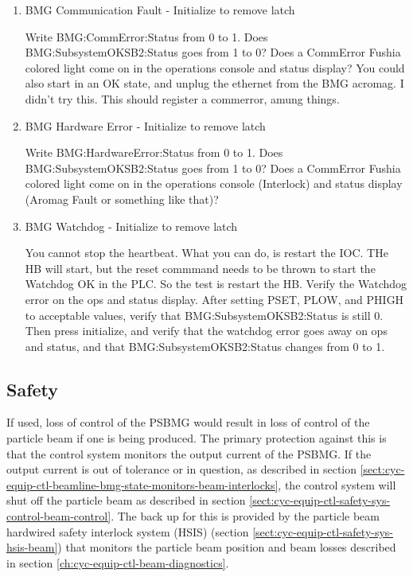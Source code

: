 \documentclass[11pt]{book}		%
\begin{document}
\begin{enumerate}
 \item BMG Communication Fault - Initialize to remove latch

\color{red}
Write BMG:CommError:Status from 0 to 1. Does BMG:SubsystemOKSB2:Status goes from 1 to 0? Does a CommError Fushia colored light come on in the operations console and status display? You could also start in an OK state, and unplug the ethernet from the BMG acromag. I didn't try this. This should register a commerror, amung things.
\color{black}

 \item BMG Hardware Error - Initialize to remove latch

\color{red}
Write BMG:HardwareError:Status from 0 to 1. Does BMG:SubsystemOKSB2:Status goes from 1 to 0? Does a CommError Fushia colored light come on in the operations console (Interlock) and status display (Aromag Fault or something like that)?
\color{black}


 \item BMG Watchdog - Initialize to remove latch

\color{red}
You cannot stop the heartbeat. What you can do, is restart the IOC. THe HB will start, but the reset commmand needs to be thrown to start the Watchdog OK in the PLC. So the test is restart the HB. Verify the Watchdog error on the ops and status display. After setting PSET, PLOW, and PHIGH to acceptable values, verify that BMG:SubsystemOKSB2:Status is still 0. Then press initialize, and verify that the watchdog error goes away on ops and status, and that BMG:SubsystemOKSB2:Status changes from 0 to 1.
\color{black}


\end{enumerate}


\subsection{Safety}

If used, loss of control of the PSBMG would result in loss of control of the particle beam if one is being produced.  The primary protection against this is that the control system monitors the output current of the PSBMG.  If the output current is out of tolerance or in question, as described in section \ref{sect:cyc-equip-ctl-beamline-bmg-state-monitors-beam-interlocks}, the control system will shut off the particle beam as described in section \ref{sect:cyc-equip-ctl-safety-sys-control-beam-control}.  The back up for this is provided by the particle beam hardwired safety interlock system (HSIS) (section \ref{sect:cyc-equip-ctl-safety-sys-hsis-beam}) that monitors the particle beam position and beam losses described in section \ref{ch:cyc-equip-ctl-beam-diagnostics}.
\end{document}
